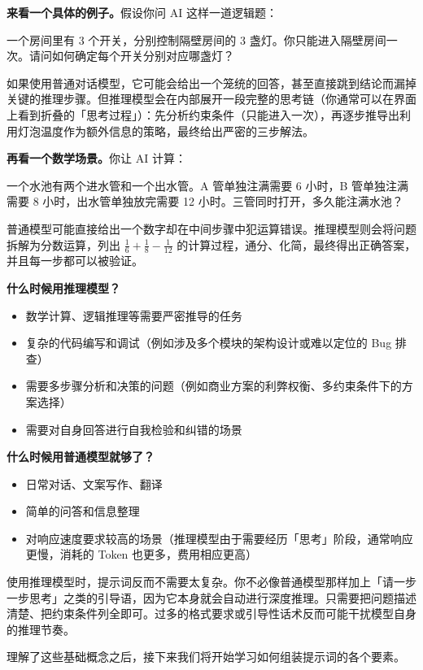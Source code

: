 \textbf{来看一个具体的例子。}假设你问 AI 这样一道逻辑题：

\begin{promptbox}
一个房间里有 3 个开关，分别控制隔壁房间的 3 盏灯。你只能进入隔壁房间一次。请问如何确定每个开关分别对应哪盏灯？
\end{promptbox}

如果使用普通对话模型，它可能会给出一个笼统的回答，甚至直接跳到结论而漏掉关键的推理步骤。但推理模型会在内部展开一段完整的思考链（你通常可以在界面上看到折叠的「思考过程」）：先分析约束条件（只能进入一次），再逐步推导出利用灯泡温度作为额外信息的策略，最终给出严密的三步解法。

\textbf{再看一个数学场景。}你让 AI 计算：

\begin{promptbox}
一个水池有两个进水管和一个出水管。A 管单独注满需要 6 小时，B 管单独注满需要 8 小时，出水管单独放完需要 12 小时。三管同时打开，多久能注满水池？
\end{promptbox}

普通模型可能直接给出一个数字却在中间步骤中犯运算错误。推理模型则会将问题拆解为分数运算，列出 $\frac{1}{6} + \frac{1}{8} - \frac{1}{12}$ 的计算过程，通分、化简，最终得出正确答案，并且每一步都可以被验证。

\textbf{什么时候用推理模型？}

\begin{itemize}
  \item 数学计算、逻辑推理等需要严密推导的任务
  \item 复杂的代码编写和调试（例如涉及多个模块的架构设计或难以定位的 Bug 排查）
  \item 需要多步骤分析和决策的问题（例如商业方案的利弊权衡、多约束条件下的方案选择）
  \item 需要对自身回答进行自我检验和纠错的场景
\end{itemize}

\textbf{什么时候用普通模型就够了？}

\begin{itemize}
  \item 日常对话、文案写作、翻译
  \item 简单的问答和信息整理
  \item 对响应速度要求较高的场景（推理模型由于需要经历「思考」阶段，通常响应更慢，消耗的 Token 也更多，费用相应更高）
\end{itemize}

\begin{tipbox}
使用推理模型时，提示词反而不需要太复杂。你不必像普通模型那样加上「请一步一步思考」之类的引导语，因为它本身就会自动进行深度推理。只需要把问题描述清楚、把约束条件列全即可。过多的格式要求或引导性话术反而可能干扰模型自身的推理节奏。
\end{tipbox}

理解了这些基础概念之后，接下来我们将开始学习如何组装提示词的各个要素。

